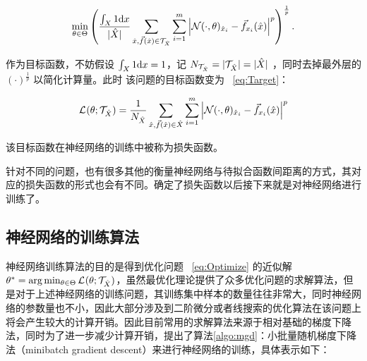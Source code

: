 \begin{equation}\label{eq:EstiOptm}
    \min_{\theta \in \Theta} \left(\frac{\int_{X} {1} \mathrm{d} {x}}{|\hat{X}|}\sum_{\hat{x},\vec{f}(\hat{x}) \in \mathcal{T}_{\hat{X}}} \sum_{i=1}^{m} \left| \mathcal{N}(\cdot,\theta)_{\hat{x}_i} - \vec{f}_{x_i}(\hat{x}) \right|^{p} \right)^{\frac{1}{p}}.
\end{equation}

作为目标函数，不妨假设 $\int_{X} {1} \mathrm{d} {x} = 1$，记 $N_{\mathcal{T}_{\hat{X}}} = |\mathcal{T}_{\hat{X}}| = |\hat{X}|$ ，同时去掉最外层的 $(\cdot)^{\frac{1}{p}}$ 以简化计算量。此时 该问题的目标函数变为 ~\eqref{eq:Target}：

\begin{equation}\label{eq:Target}
    \mathcal{L}_{}({\theta};{\mathcal{T}_{\hat{X}}}) = \frac{1}{N_{\hat{X}}} \sum_{\substack{\hat{x},\vec{f}(\hat{x}) \in \hat{X}}} \sum_{i=1}^{m} \left| {\mathcal{N}(\cdot,\theta)_{\hat{x}_i} - \vec{f}_{x_i}(\hat{x})} \right|^{p}
\end{equation}

该目标函数在神经网络的训练中被称为损失函数。

针对不同的问题，也有很多其他的衡量神经网络与待拟合函数间距离的方式，其对应的损失函数的形式也会有不同。确定了损失函数以后接下来就是对神经网络进行训练了。

\subsection{神经网络的训练算法}

神经网络训练算法的目的是得到优化问题 ~\eqref{eq:Optimize} 的近似解 $\theta^* = \arg \min_{\theta \in \Theta} \mathcal{L}_{}({\theta};{\mathcal{T}_{\hat{X}}})$，虽然最优化理论提供了众多优化问题的求解算法，但是对于上述神经网络的训练问题，其训练集中样本的数量往往非常大，同时神经网络的参数量也不小，因此大部分涉及到二阶微分或者线搜索的优化算法在该问题上将会产生较大的计算开销。因此目前常用的求解算法来源于相对基础的梯度下降法，同时为了进一步减少计算开销，提出了算法\ref{algo:mgd}：小批量随机梯度下降法（minibatch gradient descent）来进行神经网络的训练，具体表示如下：

